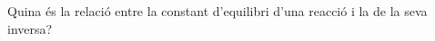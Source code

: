 \begin{exr}{}
Quina és la relació entre la constant d'equilibri d'una reacció i la de la seva inversa?
\end{exr}
